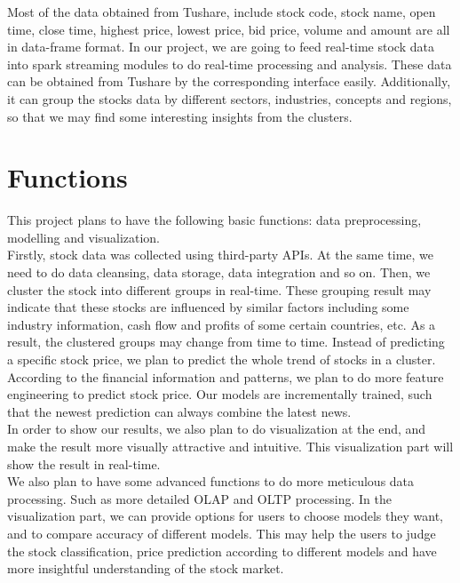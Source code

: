 \documentclass{vgtc}                          %
\begin{document}
\noindent Most of the data obtained from Tushare, include stock code, stock name, open time, close time, highest price, lowest price, bid price, volume and amount are all in data-frame format. In our project, we are going to feed real-time stock data into spark streaming modules to do real-time processing and analysis. These data can be obtained from Tushare by the corresponding interface easily. Additionally, it can group the stocks data by different sectors, industries, concepts and regions, so that we may find some interesting insights from the clusters.

\section{Functions}
\noindent This project plans to have the following basic functions: data preprocessing, modelling and visualization.\\

\noindent Firstly, stock data was collected using third-party APIs. At the same time, we need to do data cleansing, data storage, data integration and so on. Then, we cluster the stock into different groups in real-time. These grouping result may indicate that these stocks are influenced by similar factors including some industry information, cash flow and profits of some certain countries, etc. As a result, the clustered groups may change from time to time. Instead of predicting a specific stock price, we plan to predict the whole trend of stocks in a cluster. According to the financial information and patterns, we plan to do more feature engineering to predict stock price. Our models are incrementally trained, such that the newest prediction can always combine the latest news.\\

\noindent In order to show our results, we also plan to do visualization at the end, and make the result more visually attractive and intuitive. This visualization part will show the result in real-time. \\

\noindent We also plan to have some advanced functions to do more meticulous data processing. Such as more detailed OLAP and OLTP processing. In the visualization part, we can provide options for users to choose models they want, and to compare accuracy of different models. This may help the users to judge the stock classification, price prediction according to different models and have more insightful understanding of the stock market.
\end{document}
